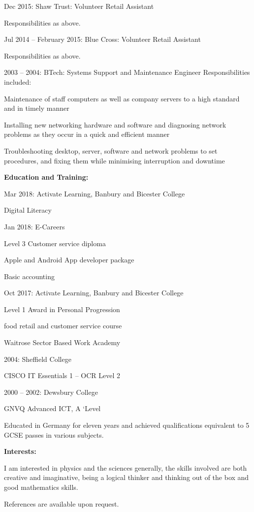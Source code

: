\documentclass[12pt,a4paper]{book}
\begin{document}
\begin{flushleft}
  Dec 2015: Shaw Trust: Volunteer Retail Assistant

Responsibilities as above.

  Jul 2014 -- February 2015: Blue Cross: Volunteer Retail Assistant

Responsibilities as above.

2003 -- 2004: BTech: Systems Support and Maintenance Engineer
Responsibilities included:

  Maintenance of staff computers as well as company servers to a high
  standard and in timely manner

  Installing new networking hardware and software and diagnosing network
  problems as they occur in a quick and efficient manner

  Troubleshooting desktop, server, software and network problems to set
  procedures, and fixing them while minimising interruption and downtime

\textbf {Education and Training:}

  Mar 2018: Activate Learning, Banbury and Bicester College

    Digital Literacy

  Jan 2018: E-Careers

    Level 3 Customer service diploma

    Apple and Android App developer package

    Basic accounting

  Oct 2017: Activate Learning, Banbury and Bicester College

    Level 1 Award in Personal Progression

    food retail and customer service course

    Waitrose Sector Based Work Academy

  2004: Sheffield College

    CISCO IT Essentials 1 -- OCR Level 2

  2000 -- 2002: Dewsbury College

    GNVQ Advanced ICT, A `Level

Educated in Germany for eleven years and achieved qualifications
equivalent to 5 GCSE passes in various subjects.

\textbf {Interests:}

I am interested in physics and the sciences generally, the skills
involved are both creative and imaginative, being a logical thinker and
thinking out of the box and good mathematics skills.

References are available upon request.
\end{flushleft}
\end{document}
